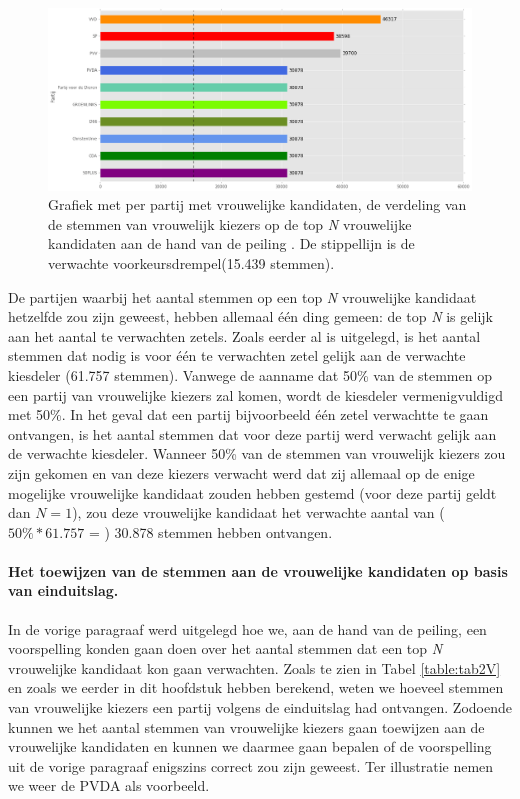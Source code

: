   
\begin{figure}[H]

	\includegraphics[width=\linewidth]	{stemmen_op_vrouwen_topN_peiling.png}

			\caption{Grafiek met per partij met vrouwelijke kandidaten, de verdeling van de stemmen van vrouwelijk kiezers op de top \textit{N} vrouwelijke kandidaten aan de hand van de peiling \citep{IPSOS}. De stippellijn is de verwachte voorkeursdrempel(15.439 stemmen).}

\label{fig:stemmenV1}
\end{figure}


De partijen waarbij het aantal stemmen op een top \textit{N} vrouwelijke kandidaat hetzelfde zou zijn geweest, hebben allemaal één ding gemeen: de top \textit{N} is gelijk aan het aantal te verwachten zetels. Zoals eerder al is uitgelegd, is het aantal stemmen dat nodig is voor één te verwachten zetel gelijk aan de verwachte kiesdeler (61.757 stemmen). Vanwege de aanname dat 50\% van de stemmen op een partij van vrouwelijke kiezers zal komen, wordt de kiesdeler vermenigvuldigd met 50\%. In het geval dat een partij bijvoorbeeld één zetel verwachtte te gaan ontvangen, is het aantal stemmen dat voor deze partij werd verwacht gelijk aan de verwachte kiesdeler. Wanneer 50\% van de stemmen van vrouwelijk kiezers zou zijn gekomen en van deze kiezers verwacht werd dat zij allemaal op de enige mogelijke vrouwelijke kandidaat zouden hebben gestemd (voor deze partij geldt dan $N=1$), zou deze vrouwelijke kandidaat het verwachte aantal van ($50\%*61.757$ = ) 30.878 stemmen hebben ontvangen. 


\paragraph{Het toewijzen van de stemmen aan de vrouwelijke kandidaten op basis van einduitslag.}
In de vorige paragraaf werd uitgelegd hoe we, aan de hand van de peiling, een voorspelling konden gaan doen over het aantal stemmen dat een top \textit{N} vrouwelijke kandidaat kon gaan verwachten. Zoals te zien in Tabel \ref{table:tab2V} en zoals we eerder in dit hoofdstuk hebben berekend, weten we hoeveel stemmen van vrouwelijke kiezers een partij volgens de einduitslag had ontvangen. Zodoende kunnen we het aantal stemmen van vrouwelijke kiezers gaan toewijzen aan de vrouwelijke kandidaten en kunnen we daarmee gaan bepalen of de voorspelling uit de vorige paragraaf enigszins correct zou zijn geweest. Ter illustratie nemen we weer de PVDA als voorbeeld. 

